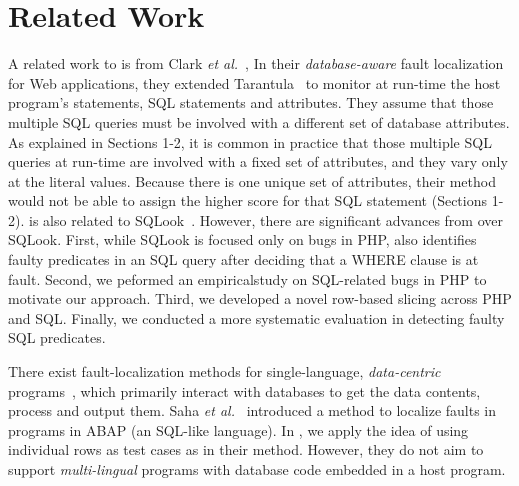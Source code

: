 \section{Related Work}

A related work to {\tool} is from Clark {\em et al.}~\cite{ga-ase11},
In their {\em database-aware} fault localization for Web applications,
they extended Tarantula~\cite{tarantula05} to monitor at run-time the
host program's statements, SQL statements and attributes.
They assume that those multiple SQL queries must be involved with a
different set of database attributes. As explained in Sections 1-2,
it is common in practice that those multiple SQL queries at run-time
are involved with a fixed set of attributes, and they vary only at the
literal values.
Because there is one unique set of attributes, their method would not
be able to assign the higher score for that SQL statement (Sections
1-2).  {\tool} is also related to SQLook~\cite{icsm13}. However, there
are significant advances from {\tool} over SQLook. First, while SQLook
is focused only on bugs in PHP, {\tool} also identifies faulty
predicates in an SQL query after deciding that a WHERE clause is at
fault. Second, we peformed an empiricalstudy on SQL-related bugs in
PHP to motivate our approach. Third, we developed a novel row-based
slicing across PHP and SQL. Finally, we conducted a more systematic
evaluation in detecting faulty SQL predicates.

There exist fault-localization methods for single-language,
{\em data-centric} programs~\cite{dor-issta08,litvak10,saha11}, which
primarily interact with databases to get the data contents, process
and output them. Saha {\em et al.}~\cite{saha11} introduced a method
to localize faults in programs in ABAP (an SQL-like language). In
{\tool}, we apply the idea of using individual rows as test cases as
in their method.
However, they do not aim to support {\em multi-lingual} programs with
database code embedded in a host program. 

